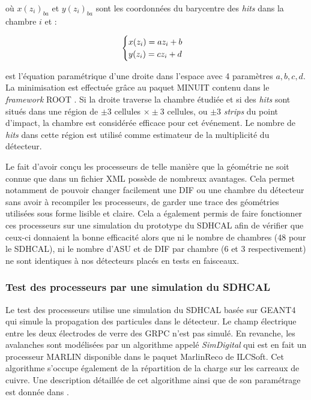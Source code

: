 \begin{itemize}[label=$\bullet$]
	où $x(z_{i})_{ba}$ et $y(z_{i})_{ba}$ sont les coordonnées du barycentre des \textit{hits} dans la chambre $i$ et :
	
\begin{equation}
\begin{cases}
\strut x(z_i)=az_i+b\\
y(z_i)=cz_i+d
\end{cases}
\end{equation}

est l'équation paramétrique d'une droite dans l'espace avec \num{4} paramètres $a,b,c,d$. La minimisation est effectuée grâce au paquet MINUIT \cite{James:2004xla} contenu dans le \textit{framework} ROOT \cite{BRUN199781}.
Si la droite traverse la chambre étudiée et si des \textit{hits} sont situés dans une région de $\pm 3$ cellules $\times\pm 3$ cellules, ou $\pm 3$ \textit{strips} du point d'impact, la chambre est considérée efficace pour cet événement. Le nombre de \textit{hits} dans cette région est utilisé comme estimateur de la multiplicité du détecteur.
\end{itemize}

Le fait d'avoir conçu les processeurs de telle manière que la géométrie ne soit connue que dans un fichier XML possède de nombreux avantages. Cela permet notamment de pouvoir changer facilement une DIF ou une chambre du détecteur sans avoir à recompiler les processeurs, de garder une trace des géométries utilisées sous forme lisible et claire. Cela a également permis de faire fonctionner ces processeurs sur une simulation du prototype du SDHCAL afin de vérifier que ceux-ci donnaient la bonne efficacité alors que ni le nombre de chambres (\num{48} pour le SDHCAL), ni le nombre d'ASU et de DIF par chambre (\num{6} et \num{3} respectivement) ne sont identiques à nos détecteurs placés en tests en faisceaux.

\subsubsection{Test des processeurs par une simulation du SDHCAL}
Le test des processeurs utilise une simulation du SDHCAL basée sur GEANT4\cite{AGOSTINELLI2003250} qui simule la propagation des particules dans le détecteur. Le champ électrique entre les deux électrodes de verre des GRPC n'est pas simulé. En revanche, les avalanches sont modélisées par un algorithme appelé \textit{SimDigital} qui est en fait un processeur MARLIN disponible dans le paquet MarlinReco \cite{2007Prama} de ILCSoft. Cet algorithme s'occupe également de la répartition de la charge sur les carreaux de cuivre. Une description détaillée de cet algorithme ainsi que de son paramétrage est donnée dans \cite{steen:tel-01282680}.

